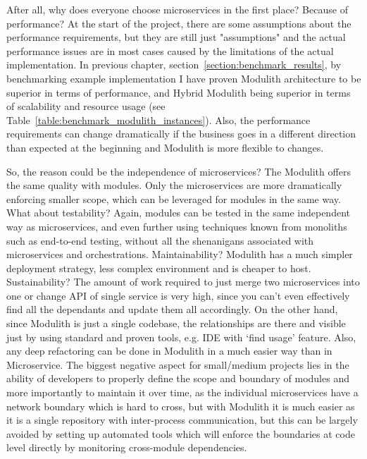 After all, why does everyone choose microservices in the first place? Because of performance? At the start of the project, there are some assumptions about the performance requirements, but they are still just "assumptions" and the actual performance issues are in most cases caused by the limitations of the actual implementation. In previous chapter, section~\ref{section:benchmark_results}, by benchmarking example implementation I have proven Modulith architecture to be superior in terms of performance, and Hybrid Modulith being superior in terms of scalability and resource usage (see Table~\ref{table:benchmark_modulith_instances}). Also, the performance requirements can change dramatically if the business goes in a different direction than expected at the beginning and Modulith is more flexible to changes.

So, the reason could be the independence of microservices? The Modulith offers the same quality with modules. Only the microservices are more dramatically enforcing smaller scope, which can be leveraged for modules in the same way. What about testability? Again, modules can be tested in the same independent way as microservices, and even further using techniques known from monoliths such as end-to-end testing, without all the shenanigans associated with microservices and orchestrations. Maintainability? Modulith has a much simpler deployment strategy, less complex environment and is cheaper to host. Sustainability? The amount of work required to just merge two microservices into one or change API of single service is very high, since you can't even effectively find all the dependants and update them all accordingly. On the other hand, since Modulith is just a single codebase, the relationships are there and visible just by using standard and proven tools, e.g. IDE with `find usage' feature. Also, any deep refactoring can be done in Modulith in a much easier way than in Microservice. The biggest negative aspect for small/medium projects lies in the ability of developers to properly define the scope and boundary of modules and more importantly to maintain it over time, as the individual microservices have a network boundary which is hard to cross, but with Modulith it is much easier as it is a single repository with inter-process communication, but this can be largely avoided by setting up automated tools which will enforce the boundaries at code level directly by monitoring cross-module dependencies.




